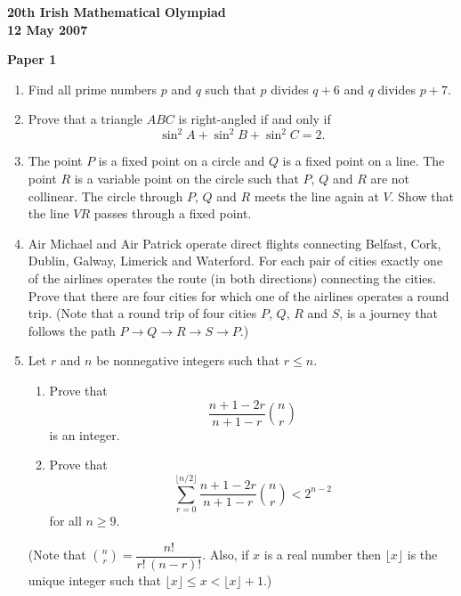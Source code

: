 \documentclass[12pt]{article}
\begin{document}
\begin{center}
{\large\bfseries 20th Irish Mathematical Olympiad\\12 May 2007}
\end{center}
\bigskip\noindent\textbf{Paper 1}\bigskip
\begin{enumerate}
\item Find all prime numbers $p$ and $q$ such that $p$ divides $q + 6$ and $q$ divides $p + 7$.

\item Prove that a triangle $ABC$ is right-angled if and only if
\[
\sin^2 A + \sin^2 B + \sin^2 C = 2.
\]

\item The point $P$ is a fixed point on a circle and $Q$ is a fixed point on a line. The point $R$ is a variable point on the circle such that $P$, $Q$ and $R$ are not collinear. The circle through $P$, $Q$ and $R$ meets the line again at $V$. Show that the line $VR$ passes through a fixed point.

\item Air Michael and Air Patrick operate direct flights connecting Belfast, Cork, Dublin, Galway, Limerick and Waterford. For each pair of cities exactly one of the airlines operates the route (in both directions) connecting the cities. Prove that there are four cities for which one of the airlines operates a round trip. (Note that a round trip of four cities $P$, $Q$, $R$ and $S$, is a journey that follows the path $P \to Q \to R \to S \to P$.)

\item Let $r$ and $n$ be nonnegative integers such that $r \le n$.

\begin{enumerate}
\item Prove that
\[
\frac{n+1-2r}{n+1-r}\binom{n}{r}
\]
is an integer.

\item Prove that
\[
\sum_{r=0}^{\lfloor n/2 \rfloor} \frac{n+1-2r}{n+1-r}\binom{n}{r} < 2^{n-2}
\]
for all $n \ge 9$.
\end{enumerate}

(Note that $\binom{n}{r} = \dfrac{n!}{r!\,(n-r)!}$. Also, if $x$ is a real number then $\lfloor x \rfloor$ is the unique integer such that $\lfloor x \rfloor \le x < \lfloor x \rfloor + 1$.)
\end{enumerate}
\end{document}
